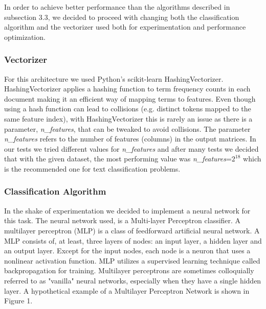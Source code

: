 In order to achieve better performance than the algorithms described in subsection 3.3, we decided to proceed with changing both the classification algorithm and the vectorizer used both for experimentation and performance optimization.

\subsubsection{Vectorizer}
For this architecture we used Python's scikit-learn HashingVectorizer. HashingVectorizer applies a hashing function to term frequency counts in each document making it an efficient way of mapping terms to features. Even though using a hash function can lead to collisions (e.g. distinct tokens mapped to the same feature index), with HashingVectorizer this is rarely an issue as there is a parameter, \textit{n\_features}, that can be tweaked to avoid collisions. The parameter \textit{n\_features} refers to the number of features (columns) in the output matrices. In our tests we tried different values for \textit{n\_features} and after many tests we decided that with the given dataset, the most performing value was \textit{n\_features}=$2^{18}$ which is the recommended one for text classification problems.

\subsubsection{Classification Algorithm}
In the shake of experimentation we decided to implement a neural network for this task. The neural network used, is a Multi-layer Perceptron classifier. A multilayer perceptron (MLP)\cite{MLP} is a class of feedforward artificial neural network. A MLP consists of, at least, three layers of nodes: an input layer, a hidden layer and an output layer. Except for the input nodes, each node is a neuron that uses a nonlinear activation function. MLP utilizes a supervised learning technique called backpropagation for training. Multilayer perceptrons are sometimes colloquially referred to as "vanilla" neural networks, especially when they have a single hidden layer. A hypothetical example of a Multilayer Perceptron Network is shown in Figure 1. 

